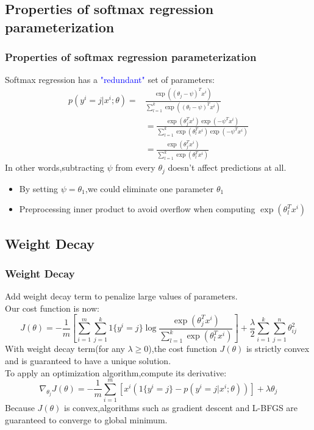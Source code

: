 \documentclass{beamer}
\begin{document}
\begin{CJK*}{UTF8}{gbsn}
\subsection{Properties of softmax regression parameterization}
\begin{frame}\frametitle{Properties of softmax regression parameterization}
Softmax regression has a \textcolor{blue}{"redundant"} set of parameters:
\begin{equation}
\begin{split}
p(y^i=j|x^i;\theta)=&\frac{\exp((\theta_j-\psi)^Tx^i)}{\sum_{l=1}^k\exp((\theta_l-\psi)^Tx^i)}\\
&=\frac{\exp(\theta_j^Tx^i)\exp(-\psi^Tx^i)}{\sum_{l=1}^k\exp(\theta_l^Tx^i)\exp(-\psi^Tx^i)}\\
&=\frac{\exp(\theta_j^Tx^i)}{\sum_{l=1}^k\exp(\theta_l^Tx^i)}
\end{split}
\end{equation}
In other words,subtracting $\psi$ from every $\theta_j$ doesn't affect predictions at all.\\
\begin{itemize}
\item By setting $\psi=\theta_1$,we could eliminate one parameter $\theta_1$
\item Preprocessing inner product to avoid overflow when computing $\exp(\theta_l^Tx^i)$
\end{itemize}
\end{frame}

\subsection{Weight Decay}
\begin{frame}\frametitle{Weight Decay}
Add weight decay term to penalize large values of parameters.\\
Our cost function is now:
\begin{equation}
J(\theta)=-\frac{1}{m}\left[\sum_{i=1}^m\sum_{j=1}^k1\{y^i=j\}\log\frac{\exp(\theta_j^Tx^i)}{\sum_{l=1}^k\exp(\theta_l^Tx^i)}\right]+\frac{\lambda}{2}\sum_{i=1}^k\sum_{j=1}^n\theta_{ij}^2
\end{equation}
With weight decay term(for any $\lambda\geq 0$),the cost function $J(\theta)$ is strictly convex and is guaranteed to have a unique solution.\\
To apply an optimization algorithm,compute its derivative:
\begin{equation}
\nabla_{\theta_j}J(\theta)=-\frac{1}{m}\sum_{i=1}^m\left[x^i(1\{y^i=j\}-p(y^i=j|x^i;\theta))\right]+\lambda\theta_j
\end{equation}
Because $J(\theta)$ is convex,algorithms such as gradient descent and L-BFGS are guaranteed to converge to global minimum.
\end{frame}


\end{CJK*}
\end{document}
